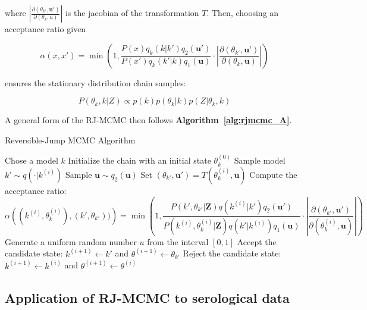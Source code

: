 where $\left|\frac{\partial(\theta_{k'}, \textbf{u}')}{\partial(\theta_k, u)} \right|$ is the jacobian of the transformation $T$. Then, choosing an acceptance ratio given 
 
 \begin{equation}
 \label{eq:alpharj}
  \alpha\left(x, x'\right) = \min\left(1, \frac{P(x)q_k(k | k')q_2(\textbf{u}') }{P(x')q_k(k' | k)q_1(\textbf{u}) }\cdot\left|\frac{\partial(\theta_{k'}, \textbf{u'})}{\partial(\theta_k, \mathbf{u})} \right|\right)
 \end{equation}


ensures the stationary distribution chain samples:

\begin{equation}
P(\theta_k, k | Z) \propto p(k)p(\theta_k|k)p(Z | \theta_k, k)
\end{equation}

A general form of the RJ-MCMC then follows \textbf{Algorithm~\ref{alg:rjmcmc_A}}.

\begin{algorithm}[H]
\caption{Reversible-Jump MCMC Algorithm}
\label{alg:rjmcmc_A}
\begin{algorithmic}[1]
    \State Chose a model $k$
    \State Initialize the chain with an initial state $\theta^{(0)}_{k}$
         \State Sample model $k' \sim q(\cdot | k^{(i)})$
         \State Sample $\mathbf{u} \sim q_2(\textbf{u})$
	\State Set $(\theta_{k'}, \mathbf{u'}) = T(\theta_k^{(i)}, \mathbf{u})$
        \State Compute the acceptance ratio:
        \[
        \alpha \left((k^{(i)}, \theta_k^{(i)}), (k', \theta_{k'})) \right) = \min\left(1, \frac{P\left(k', \theta_{k'} | \mathbf{Z}\right)q(k^{(i)}|k')q_{2}(\mathbf{u}')}{P\left(k^{(i)}, \theta^{(i)}_{k} | \mathbf{Z}\right)q(k' | k^{(i)})q_{1}(\textbf{u})} \cdot \left| \frac{\partial(\theta_{k'}, \textbf{u}')}{\partial(\theta_k^{(i)}, \textbf{u})}\right| \right)
        \]
        \State Generate a uniform random number $u$ from the interval $[0, 1]$
            \State Accept the candidate state: $k^{(i + 1)} \leftarrow k'$ and  $\theta^{(i+1)} \leftarrow \theta_{k'}$
        \Else
            \State Reject the candidate state:$k^{(i + 1)} \leftarrow k^{(i)}$ and  $\theta^{(i+1)} \leftarrow \theta^{(i)}$
        \EndIf
    \EndFor
\end{algorithmic}
\end{algorithm}



\subsection{Application of RJ-MCMC to serological data}
